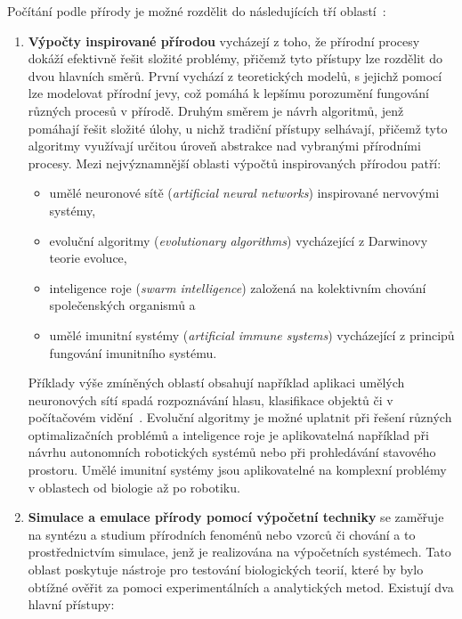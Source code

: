 Počítání podle přírody je možné rozdělit do následujících tří oblastí~\cite{FundamentalNatural}:
\begin{enumerate}
    \item \textbf{Výpočty inspirované přírodou}
        vycházejí z toho, že přírodní procesy dokáží efektivně řešit složité problémy, přičemž tyto přístupy lze rozdělit do dvou hlavních směrů. 
        První vychází z teoretických modelů, s jejichž pomocí lze modelovat přírodní jevy, což pomáhá k lepšímu porozumění fungování různých procesů v přírodě. 
        Druhým směrem je návrh algoritmů, jenž pomáhají řešit složité úlohy, u nichž tradiční přístupy selhávají, přičemž tyto algoritmy využívají určitou úroveň abstrakce nad vybranými přírodními procesy.
        Mezi nejvýznamnější oblasti výpočtů inspirovaných přírodou patří:
        \begin{itemize}
            \item umělé neuronové sítě (\emph{artificial neural networks}) inspirované nervovými systémy,
            \item evoluční algoritmy (\emph{evolutionary algorithms}) vycházející z Darwinovy teorie evoluce,
            \item inteligence roje (\emph{swarm intelligence}) založená na kolektivním chování společenských organismů a
            \item umělé imunitní systémy (\emph{artificial immune systems}) vycházející z principů fungování imunitního systému.
        \end{itemize}
        Příklady výše zmíněných oblastí obsahují například aplikaci umělých neuronových sítí spadá rozpoznávání hlasu, klasifikace objektů či v počítačovém vidění~\cite{ANN-review,ANN-survey}. 
        Evoluční algoritmy je možné uplatnit při řešení různých optimalizačních problémů a inteligence roje je aplikovatelná například při návrhu autonomních robotických systémů nebo při prohledávání stavového prostoru. 
        Umělé imunitní systémy jsou aplikovatelné na komplexní problémy v oblastech od biologie až po robotiku. 
    \item \textbf{Simulace a emulace přírody pomocí výpočetní techniky}
        se zaměřuje na syntézu a studium přírodních fenoménů nebo vzorců či chování a to prostřednictvím simulace, jenž je realizována na výpočetních systémech. 
        Tato oblast poskytuje nástroje pro testování biologických teorií, které by bylo obtížné ověřit za pomoci experimentálních a analytických metod. Existují dva hlavní přístupy:
        \begin{itemize}

\end{itemize}
\end{enumerate}
